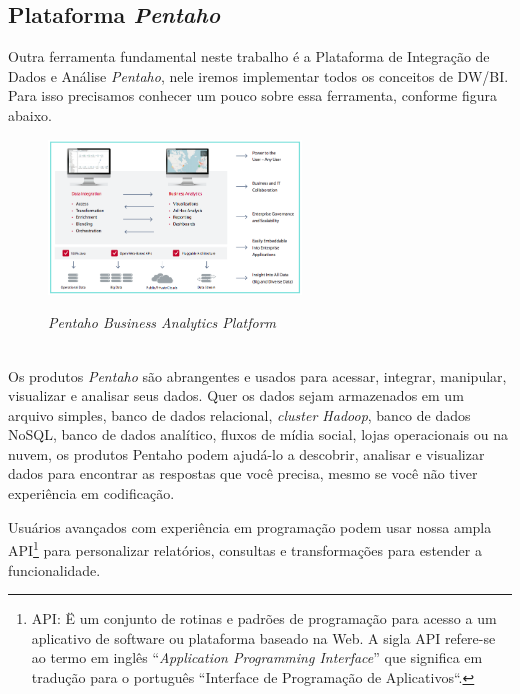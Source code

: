 
\subsection{Plataforma \textit{Pentaho}}

Outra ferramenta fundamental neste trabalho \'{e} a Plataforma de Integra\c{c}\~{a}o de Dados e An\'{a}lise \textit{Pentaho}, nele iremos implementar todos os conceitos de DW/BI. Para isso precisamos conhecer um pouco sobre essa ferramenta, conforme figura abaixo.

\begin{figure}[H]
	\vspace*{0,2cm}
    \centering
    \caption{\textit{Pentaho Business Analytics Platform}}
    \includegraphics[width=0.6\textwidth]{./04-figuras/figura-15}
    \label{fig:ilustfig15}
\end{figure}
\vspace*{-0,9cm}
{\raggedright {}}\\

Os produtos \textit{Pentaho} s\~{a}o abrangentes e usados para acessar, integrar, manipular, visualizar e analisar seus dados. 
Quer os dados sejam armazenados em um arquivo simples, banco de dados relacional, \textit{cluster Hadoop}, banco de dados 
NoSQL, banco de dados anal\'{i}tico, fluxos de m\'{i}dia social, lojas operacionais ou na nuvem, os produtos Pentaho 
podem ajud\'{a}-lo a descobrir, analisar e visualizar dados para encontrar as respostas que você precisa, mesmo se 
você n\~{a}o tiver experiência em codifica\c{c}\~{a}o. 

Usu\'{a}rios avan\c{c}ados com experiência em programa\c{c}\~{a}o podem usar nossa ampla API\footnote{API: 
Ë um conjunto de rotinas e padr\~{o}es de programa\c{c}\~{a}o para acesso a um aplicativo de software ou plataforma 
baseado na Web. A sigla API refere-se ao termo em inglês ``\textit{Application Programming Interface}'' que 
significa em tradu\c{c}\~{a}o para o português ``Interface de Programa\c{c}\~{a}o de Aplicativos``.} para personalizar 
relat\'orios, consultas e transforma\c{c}\~{o}es para estender a funcionalidade.

